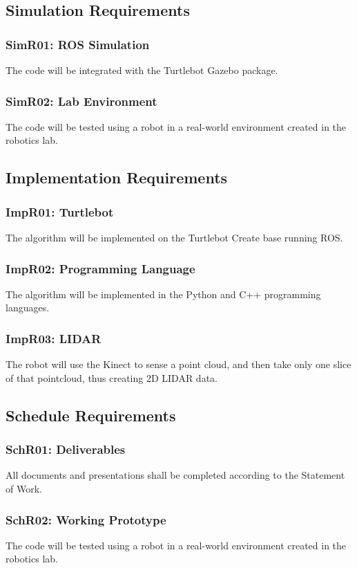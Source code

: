 \documentclass{article}
\begin{document}
\subsection{Simulation Requirements}
\subsubsection{SimR01: ROS Simulation}
The code will be integrated with the Turtlebot Gazebo package.
\subsubsection{SimR02: Lab Environment}
The code will be tested using a robot in a real-world environment created in the robotics lab.

\subsection{Implementation Requirements}
\subsubsection{ImpR01: Turtlebot}
The algorithm will be implemented on the Turtlebot Create base running ROS.
\subsubsection{ImpR02: Programming Language}
The algorithm will be implemented in the Python and C++ programming languages.
\subsubsection{ImpR03: LIDAR}
The robot will use the Kinect to sense a point cloud, and then take only one slice of that pointcloud, thus creating 2D LIDAR data.

\subsection{Schedule Requirements}
\subsubsection{SchR01: Deliverables}
All documents and presentations shall be completed according to the Statement of Work.\citep{SOW}
\subsubsection{SchR02: Working Prototype}
The code will be tested using a robot in a real-world environment created in the robotics lab.
\end{document}
